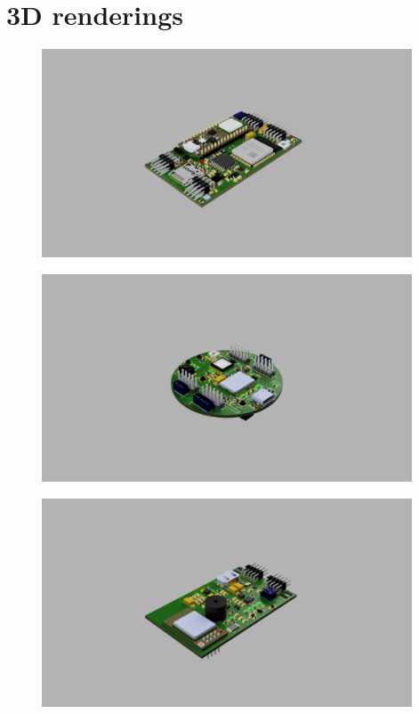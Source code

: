 \documentclass[11pt]{article}
\begin{document}
\section{3D renderings}\label{A2}
\begin{figure}
    \centering
    \includegraphics[width=11cm]{images/Sensor_board.png}
    \label{fig:img1}
\end{figure}

\begin{figure}
    \centering
    \includegraphics[width=11cm]{images/Topboard.png}
    \label{fig:img2}
\end{figure}

\begin{figure}
    \centering
    \includegraphics[width=11cm]{images/Power_board_v1.png}
    \label{fig:img3}
\end{figure}
\end{document}
